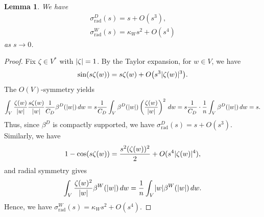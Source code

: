 \documentclass[a4paper,oneside,12pt]{amsart}
\theoremstyle{plain}
\newtheorem{lemma}[theorem]{Lemma}
\theoremstyle{definition}
\theoremstyle{remark}
\DeclarePairedDelimiter{\abs}{\lvert}{\rvert}
\newcommand{\cutoff}{\beta}
\newcommand{\cutoffDirac}{\cutoff^D}
\newcommand{\cutoffWilson}{\cutoff^W}
\newcommand{\symbolDirac}{\sigma^D}
\newcommand{\symbolWilson}{\sigma^W}
\newcommand{\radialsymbolDirac}{\symbolDirac_{\mathrm{rad}}}
\newcommand{\radialsymbolWilson}{\symbolWilson_{\mathrm{rad}}}
\begin{document}
\begin{lemma}\label{lemma: asymptotics s to 0}
  We have
  \begin{gather}
    \radialsymbolDirac(s) = s + O(s^3), \\
    \radialsymbolWilson(s) = \kappa_W s^2 + O(s^4)
  \end{gather}
  as $s \to 0$.
\end{lemma}
\begin{proof}
  Fix $\zeta \in V^*$ with $\abs{\zeta}=1$.
  By the Taylor expansion, for $w \in V$, we have
  \begin{equation}
    \sin (s\zeta(w)) = s\zeta(w) + O\big(s^3 \abs{\zeta(w)}^3\big).
  \end{equation}
  The $O(V)$-symmetry yields
  \begin{equation}
    \int_V \frac{\zeta(w)}{\abs{w}} \frac{s\zeta(w)}{\abs{w}} \frac{1}{C_D} \cutoffDirac(\abs{w}) \,dw = s \frac{1}{C_D} \int_V \cutoffDirac(\abs{w}) \left(\frac{\zeta(w)}{\abs{w}}\right)^2 \,dw = s \frac{1}{C_D} \cdot \frac{1}{n} \int_V \cutoffDirac(\abs{w}) \,dw = s.
  \end{equation}
  Thus, since $\cutoffDirac$ is compactly supported, we have $\radialsymbolDirac(s) = s + O(s^3)$.
  Similarly, we have
  \begin{equation}
    1 - \cos(s\zeta(w)) = \frac{s^2 (\zeta(w))^2}{2} + O(s^4 \abs{\zeta(w)}^4),
  \end{equation}
  and radial symmetry gives
  \begin{equation}
    \int_V \frac{\zeta(w)^2}{\abs{w}} \cutoffWilson(\abs{w}) \,dw = \frac{1}{n} \int_V \abs{w} \cutoffWilson(\abs{w}) \,dw.
  \end{equation}
  Hence, we have $\radialsymbolWilson(s) = \kappa_W s^2 + O(s^4)$.
\end{proof}
\end{document}
